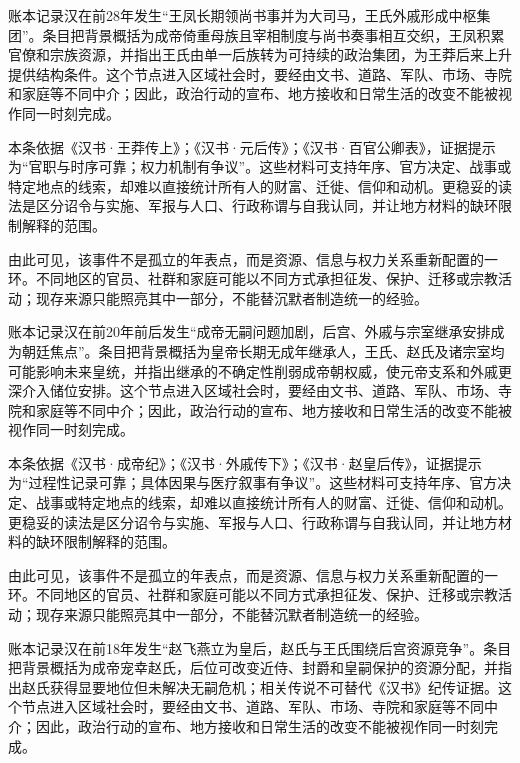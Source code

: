 账本记录汉在前28年发生“王凤长期领尚书事并为大司马，王氏外戚形成中枢集团”。条目把背景概括为成帝倚重母族且宰相制度与尚书奏事相互交织，王凤积累官僚和宗族资源，并指出王氏由单一后族转为可持续的政治集团，为王莽后来上升提供结构条件。这个节点进入区域社会时，要经由文书、道路、军队、市场、寺院和家庭等不同中介；因此，政治行动的宣布、地方接收和日常生活的改变不能被视作同一时刻完成。

本条依据《汉书·王莽传上》；《汉书·元后传》；《汉书·百官公卿表》，证据提示为“官职与时序可靠；权力机制有争议”。这些材料可支持年序、官方决定、战事或特定地点的线索，却难以直接统计所有人的财富、迁徙、信仰和动机。更稳妥的读法是区分诏令与实施、军报与人口、行政称谓与自我认同，并让地方材料的缺环限制解释的范围。

由此可见，该事件不是孤立的年表点，而是资源、信息与权力关系重新配置的一环。不同地区的官员、社群和家庭可能以不同方式承担征发、保护、迁移或宗教活动；现存来源只能照亮其中一部分，不能替沉默者制造统一的经验。

账本记录汉在前20年前后发生“成帝无嗣问题加剧，后宫、外戚与宗室继承安排成为朝廷焦点”。条目把背景概括为皇帝长期无成年继承人，王氏、赵氏及诸宗室均可能影响未来皇统，并指出继承的不确定性削弱成帝朝权威，使元帝支系和外戚更深介入储位安排。这个节点进入区域社会时，要经由文书、道路、军队、市场、寺院和家庭等不同中介；因此，政治行动的宣布、地方接收和日常生活的改变不能被视作同一时刻完成。

本条依据《汉书·成帝纪》；《汉书·外戚传下》；《汉书·赵皇后传》，证据提示为“过程性记录可靠；具体因果与医疗叙事有争议”。这些材料可支持年序、官方决定、战事或特定地点的线索，却难以直接统计所有人的财富、迁徙、信仰和动机。更稳妥的读法是区分诏令与实施、军报与人口、行政称谓与自我认同，并让地方材料的缺环限制解释的范围。

由此可见，该事件不是孤立的年表点，而是资源、信息与权力关系重新配置的一环。不同地区的官员、社群和家庭可能以不同方式承担征发、保护、迁移或宗教活动；现存来源只能照亮其中一部分，不能替沉默者制造统一的经验。

账本记录汉在前18年发生“赵飞燕立为皇后，赵氏与王氏围绕后宫资源竞争”。条目把背景概括为成帝宠幸赵氏，后位可改变近侍、封爵和皇嗣保护的资源分配，并指出赵氏获得显要地位但未解决无嗣危机；相关传说不可替代《汉书》纪传证据。这个节点进入区域社会时，要经由文书、道路、军队、市场、寺院和家庭等不同中介；因此，政治行动的宣布、地方接收和日常生活的改变不能被视作同一时刻完成。

